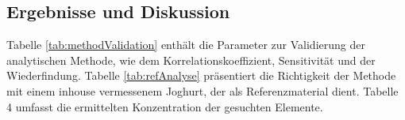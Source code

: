 \subsection{Ergebnisse und Diskussion}
Tabelle \ref{tab:methodValidation} enthält die Parameter zur Validierung der analytischen Methode, wie dem Korrelationskoeffizient, Sensitivität
und der Wiederfindung. Tabelle \ref{tab:refAnalyse} präsentiert die Richtigkeit der Methode mit einem inhouse vermessenem Joghurt, der als Referenzmaterial dient. Tabelle 4 umfasst die ermittelten Konzentration der gesuchten Elemente. 

